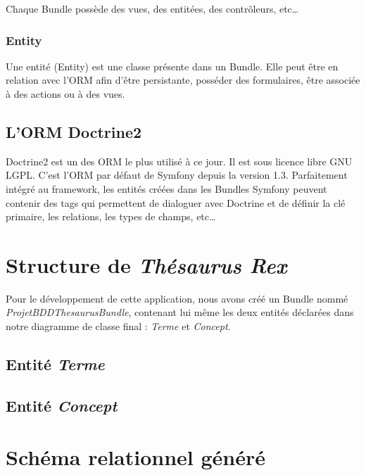 Chaque Bundle possède des vues, des entitées, des contrôleurs, etc\ldots

\subsubsection{Entity}
Une entité (Entity) est une classe présente dans un Bundle. Elle peut être en relation avec l'ORM afin d'être persistante, posséder des formulaires, être associée à des actions ou à des vues.

\subsection{L'ORM Doctrine2}

Doctrine2 est un des ORM le plus utilisé à ce jour. Il est sous licence libre GNU LGPL. C'est l'ORM par défaut de Symfony depuis la version 1.3. Parfaitement intégré au framework, les entités créées dans les Bundles Symfony peuvent contenir des tags qui permettent de dialoguer avec Doctrine et de définir la clé primaire, les relations, les types de champs, etc\ldots

\section{Structure de \emph{Thésaurus Rex}}

Pour le développement de cette application, nous avons créé un Bundle nommé \emph{ProjetBDDThesaurusBundle}, contenant lui même les deux entités déclarées dans notre diagramme de classe final : \emph{Terme} et \emph{Concept}.

\subsection{Entité \emph{Terme}}


\subsection{Entité \emph{Concept}}


\section{Schéma relationnel généré}

